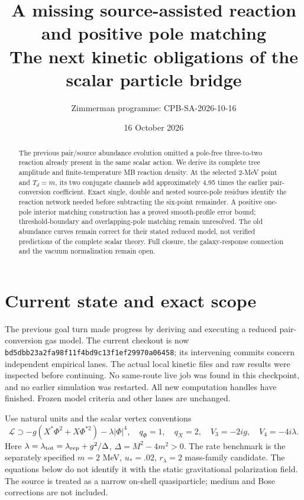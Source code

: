 \documentclass[11pt]{article}
\title{A missing source-assisted reaction and positive pole matching\\
The next kinetic obligations of the scalar particle bridge}
\author{Zimmerman programme: CPB-SA-2026-10-16}
\date{16 October 2026}
\begin{document}
\maketitle
\begin{abstract}
The previous pair/source abundance evolution omitted a pole-free
three-to-two reaction already present in the same scalar action.
We derive its complete tree amplitude and finite-temperature MB reaction
density. At the selected 2-MeV point and $T_d=m$, its two conjugate channels
add approximately 4.95 times the earlier pair-conversion coefficient.
Exact single, double and nested source-pole residues identify the reaction
network needed before subtracting the six-point remainder. A positive
one-pole interior matching construction has a proved smooth-profile error
bound; threshold-boundary and overlapping-pole matching remain unresolved.
The old abundance curves remain correct for their stated reduced model,
not verified predictions of the complete scalar theory. Full closure,
the galaxy-response connection and the vacuum normalization remain open.
\end{abstract}

\section{Current state and exact scope}
The previous goal turn made progress by deriving and executing a reduced
pair-conversion gas model. The current checkout is now
\texttt{bd5dbb23a2fa98f11f4bd9c13f1ef29970a06458}; its intervening commits
concern independent empirical lanes. The actual local kinetic files and
raw results were inspected before continuing. No same-route live job was
found in this checkpoint, and no earlier simulation was restarted.
All new computation handles have finished. Frozen model criteria and
other lanes are unchanged.

Use natural units and the scalar vertex conventions
\begin{equation}
 \mathcal L\supset-g(X^*\Phi^2+X\Phi^{*2})-\lambda|\Phi|^4,
 \quad q_\Phi=1,\quad q_X=2,
 \quad V_3=-2ig,\quad V_4=-4i\lambda.
\end{equation}
Here $\lambda=\lambda_{\rm tot}=\lambda_{\rm rep}+g^2/\Delta$,
$\Delta=M^2-4m^2>0$. The rate benchmark is the separately specified
$m=2$ MeV, $u_*=.02$, $r_\lambda=2$ mass-family candidate.
The equations below do not identify it with the static gravitational
polarization field. The source is treated as a narrow on-shell quasiparticle;
medium and Bose corrections are not included.
\end{document}
